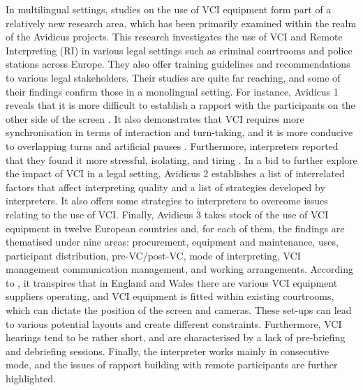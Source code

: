 \documentclass[output=paper]{langsci/langscibook}
\begin{document}
In multilingual settings, studies on the use of \textsc{VCI} equipment form part of a relatively new research area, which has been primarily examined within the realm of the Avidicus projects. This research investigates the use of \textsc{VCI} and Remote Interpreting (\textsc{RI}) in various legal settings such as criminal courtrooms and police stations across Europe. They also offer training guidelines and recommendations to various legal stakeholders. Their studies are quite far reaching, and some of their findings confirm those in a monolingual setting. For instance, Avidicus 1 reveals that it is more difficult to establish a rapport with the participants on the other side of the screen \citep{Rombouts2011}. It also demonstrates that \textsc{VCI} requires more synchronisation in terms of interaction and turn-taking, and it is more conducive to overlapping turns and artificial pauses \citep{Balogh2011}. Furthermore, interpreters reported that they found it more stressful, isolating, and tiring \citep{Miler-Cassino2011}. In a bid to further explore the impact of \textsc{VCI} in a legal setting, Avidicus 2 establishes a list of interrelated factors that affect interpreting quality and a list of strategies developed by interpreters. It also offers some strategies to interpreters to overcome issues relating to the use of \textsc{VCI}. Finally, Avidicus 3 takes stock of the use of \textsc{VCI} equipment in twelve European countries and, for each of them, the findings are thematised under nine areas: procurement, equipment and maintenance, uses, participant distribution, pre-VC/post-VC, mode of interpreting, \textsc{VCI} management communication management, and working arrangements. According to \citet{Braun2016a}, it transpires that in England and Wales there are various \textsc{VCI} equipment suppliers operating, and \textsc{VCI} equipment is fitted within existing courtrooms, which can dictate the position of the screen and cameras. These set-ups can lead to various potential layouts and create different constraints. Furthermore, \textsc{VCI} hearings tend to be rather short, and are characterised by a lack of pre-briefing and debriefing sessions. Finally, the interpreter works mainly in consecutive mode, and the issues of rapport building with remote participants are further highlighted. 
\end{document}
